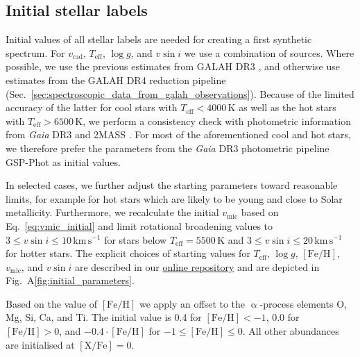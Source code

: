 \documentclass[
  journal=pasa,
  manuscript=research-paper, %
  year=2024,
  volume=37
]{cup-journal}
\newcommand{\Teff}{$T_\mathrm{eff}$\xspace}
\newcommand{\logg}{$\log g$\xspace}
\newcommand{\feh}{$\mathrm{[Fe/H]}$\xspace}
\newcommand{\vmic}{$v_\mathrm{mic}$\xspace}
\newcommand{\vsini}{$v \sin i$\xspace}
\newcommand{\vrad}{$v_\mathrm{rad}$\xspace}
\newcommand{\Gaia}{\textit{Gaia}\xspace}
\begin{document}
\subsection{Initial stellar labels}
\label{sec:initial_stellar_labels}


Initial values of all stellar labels are needed for creating a first synthetic spectrum. For \vrad, \Teff, \logg, and \vsini we use a combination of sources. Where possible, we use the previous estimates from GALAH DR3 \citep{Buder2021}, and otherwise use estimates from the GALAH DR4 reduction pipeline (Sec.~\ref{sec:spectroscopic_data_from_galah_observations}). Because of the limited accuracy of the latter for cool stars with $T_\text{eff} < 4000\,\mathrm{K}$ as well as the hot stars with $T_\text{eff} > 6500\,\mathrm{K}$, we perform a consistency check with photometric information from \Gaia DR3 \citep{Brown2021} and 2MASS \citep{Skrutskie2006}. For most of the aforementioned cool and hot stars, we therefore prefer the parameters from the \Gaia DR3 photometric pipeline GSP-Phot \citep{Andrae2022,Fouesneau2022} as initial values.

In selected cases, we further adjust the starting parameters toward reasonable limits, for example for hot stars which are likely to be young and close to Solar metallicity. Furthermore, we recalculate the initial \vmic based on Eq.~\ref{eq:vmic_initial} and limit rotational broadening values to $3 \leq v \sin i \leq 10\,\mathrm{km\,s^{-1}}$ for stars below $T_\text{eff} = 5500\,\mathrm{K}$ and $3 \leq v \sin i \leq 20\,\mathrm{km\,s^{-1}}$ for hotter stars. The explicit choices of starting values for \Teff, \logg, \feh, \vmic, and \vsini are described in our \href{https://github.com/svenbuder/GALAH_DR4/blob/main/spectrum_analysis/galah_dr4_initial_parameters.ipynb}{online repository} and are depicted in Fig.~A\ref{fig:initial_parameters}.

Based on the value of \feh we apply an offset to the $\upalpha$-process elements O, Mg, Si, Ca, and Ti. The initial value is 0.4 for $\mathrm{[Fe/H]} < -1$, 0.0 for $\mathrm{[Fe/H]} > 0$, and $-0.4 \cdot \mathrm{[Fe/H]}$ for $-1 \leq \mathrm{[Fe/H]} \leq 0$. All other abundances are initialised at $\mathrm{[X/Fe]} = 0$.
\end{document}
